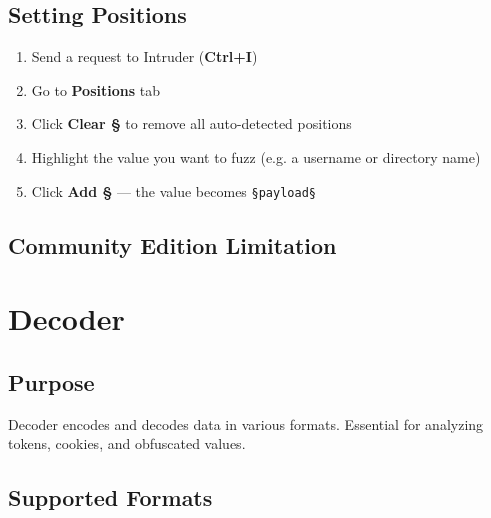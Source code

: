 \subsection{Setting Positions}

\begin{enumerate}
  \item Send a request to Intruder (\textbf{Ctrl+I})
  \item Go to \textbf{Positions} tab
  \item Click \textbf{Clear §} to remove all auto-detected positions
  \item Highlight the value you want to fuzz (e.g. a username or directory name)
  \item Click \textbf{Add §} — the value becomes \texttt{\S{}payload\S{}}
\end{enumerate}

\subsection{Community Edition Limitation}


\section{Decoder}
\label{sec:decoder}

\subsection{Purpose}

Decoder encodes and decodes data in various formats. Essential for analyzing tokens, cookies, and obfuscated values.

\subsection{Supported Formats}

